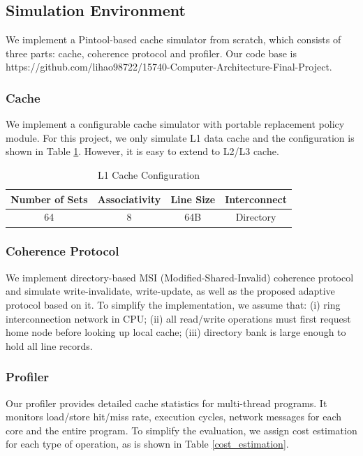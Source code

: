 \documentclass[11pt,conference]{IEEEtran}
\begin{document}
\subsection{Simulation Environment}
We implement a Pintool-based cache simulator from scratch, which consists of three parts: cache, coherence protocol and profiler. Our code base is https://github.com/lihao98722/15740-Computer-Architecture-Final-Project.
\subsubsection{Cache}
We implement a configurable cache simulator with portable replacement policy module. For this project, we only simulate L1 data cache and the configuration is shown in Table \ref{l1_cache_config}. However, it is easy to extend to L2/L3 cache.

\begin{table}[!h]
\renewcommand{\arraystretch}{2.5}
\caption{L1 Cache Configuration}
\label{l1_cache_config}
\centering
\begin{tabular}{|c|c|c|c|}
\hline
Number of Sets & Associativity & Line Size & Interconnect \\
\hline
64 & 8 & 64B & Directory \\
\hline
\end{tabular}
\end{table}
\FloatBarrier

\subsubsection{Coherence Protocol}
We implement directory-based MSI (Modified-Shared-Invalid) coherence protocol and simulate write-invalidate, write-update, as well as the proposed adaptive protocol based on it. To simplify the implementation, we assume that: (i) ring interconnection network in CPU; (ii) all read/write operations must first request home node before looking up local cache; (iii) directory bank is large enough to hold all line records.

\subsubsection{Profiler}
Our profiler provides detailed cache statistics for multi-thread programs. It monitors load/store hit/miss rate, execution cycles, network messages for each core and the entire program. To simplify the evaluation, we assign cost estimation for each type of operation, as is shown in Table \ref{cost_estimation}.
\end{document}
